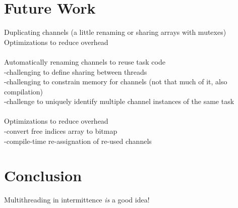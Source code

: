 \documentclass[11pt]{sensys-proc}
\begin{document}
\section{Future Work}
Duplicating channels (a little renaming or sharing arrays with mutexes)\\
Optimizations to reduce overhead\\
\\
Automatically renaming channels to reuse task code\\
-challenging to define sharing between threads\\
-challenging to constrain memory for channels (not that much of it, also compilation)\\
-challenge to uniquely identify multiple channel instances of the same task\\
\\
Optimizations to reduce overhead\\
-convert free indices array to bitmap\\
-compile-time re-assignation of re-used channels\\

\section{Conclusion}
Multithreading in intermittence {\em is} a good idea!


\balance

\end{document}
